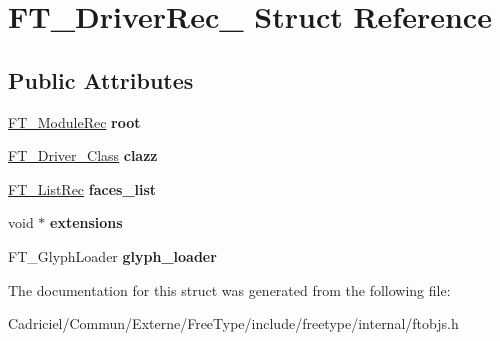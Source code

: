 \hypertarget{struct_f_t___driver_rec__}{\section{F\-T\-\_\-\-Driver\-Rec\-\_\- Struct Reference}
\label{struct_f_t___driver_rec__}
}
\subsection*{Public Attributes}
\begin{DoxyCompactItemize}
\item 
\hypertarget{struct_f_t___driver_rec___a8451ceb25c76794fb47e81f477c8222d}{\hyperlink{struct_f_t___module_rec__}{F\-T\-\_\-\-Module\-Rec} {\bfseries root}}\label{struct_f_t___driver_rec___a8451ceb25c76794fb47e81f477c8222d}

\item 
\hypertarget{struct_f_t___driver_rec___a3111153608e5abeb093ed5eb7fef5aec}{\hyperlink{struct_f_t___driver___class_rec__}{F\-T\-\_\-\-Driver\-\_\-\-Class} {\bfseries clazz}}\label{struct_f_t___driver_rec___a3111153608e5abeb093ed5eb7fef5aec}

\item 
\hypertarget{struct_f_t___driver_rec___a2602170e3ecde21a764dc32417aaa002}{\hyperlink{struct_f_t___list_rec__}{F\-T\-\_\-\-List\-Rec} {\bfseries faces\-\_\-list}}\label{struct_f_t___driver_rec___a2602170e3ecde21a764dc32417aaa002}

\item 
\hypertarget{struct_f_t___driver_rec___ad2f1c1a800723dc887dcbc7ce78203d8}{void $\ast$ {\bfseries extensions}}\label{struct_f_t___driver_rec___ad2f1c1a800723dc887dcbc7ce78203d8}

\item 
\hypertarget{struct_f_t___driver_rec___ac28e7adbc14ee82c2b7710d0ee5541e2}{F\-T\-\_\-\-Glyph\-Loader {\bfseries glyph\-\_\-loader}}\label{struct_f_t___driver_rec___ac28e7adbc14ee82c2b7710d0ee5541e2}

\end{DoxyCompactItemize}


The documentation for this struct was generated from the following file\-:\begin{DoxyCompactItemize}
\item 
Cadriciel/\-Commun/\-Externe/\-Free\-Type/include/freetype/internal/ftobjs.\-h\end{DoxyCompactItemize}
